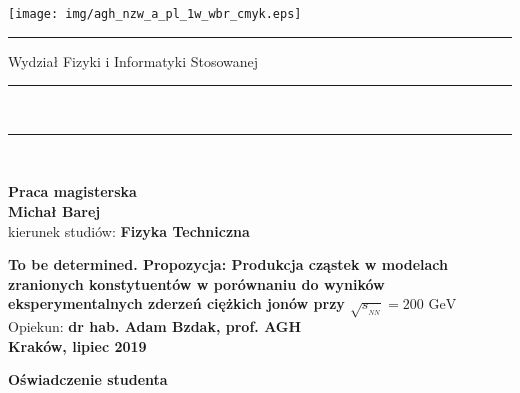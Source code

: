 \documentclass[a4paper,12pt]{article}
\begin{document}

\thispagestyle{empty}
\texttt{[image: img/agh\_nzw\_a\_pl\_1w\_wbr\_cmyk.eps]}\\
\rule{30mm}{0pt}
{\large \textsf{Wydział Fizyki i Informatyki Stosowanej}}\\
\rule{\textwidth}{3pt}\\
\rule[2ex]
{\textwidth}{1pt}\\
\vspace{7ex}
\begin{center}
{\LARGE \bf \textsf{Praca magisterska}}\\
\vspace{13ex}
{\bf \Large \textsf{Michał Barej}}\\
\vspace{3ex}
{\sf\small kierunek studiów:} {\bf\small \textsf{Fizyka Techniczna}}\\
\vspace{1.5ex}

{\bf \huge \textsf{To be determined. Propozycja: Produkcja cząstek w modelach zranionych konstytuentów w porównaniu do wyników eksperymentalnych zderzeń ciężkich jonów przy $\sqrt{s_{_{NN}}} =\text{200~GeV}$}}\\
\vspace{14ex}
{\Large Opiekun: \bf \textsf{dr hab. Adam Bzdak, prof. AGH}}\\
\vspace{22ex}
{\large \bf \textsf{Kraków, lipiec 2019}}
\end{center}

\newpage

\begin{center}
        {\bf\large\textsf{Oświadczenie studenta}}
\end{center}
\end{document}
